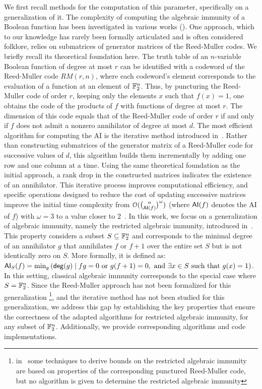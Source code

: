 \documentclass[11pt]{llncs}
\begin{document}
We first recall methods for the computation of this parameter, specifically on a generalization of it.
The complexity of computing the algebraic immunity of a Boolean function has been investigated in various works (\eg \cite{EC:CouMei03,EC:ACGKMR06,C:HawRos04,FSE:DidTil06}).  
One approach, which to our knowledge has rarely been formally articulated and is often considered folklore, relies on submatrices of generator matrices of the Reed-Muller codes. 
We briefly recall its theoretical foundation here. 
The truth table of an $n$-variable Boolean function of degree at most $r$ can be identified with a codeword of the Reed-Muller code $RM(r,n)$, where each codeword's element corresponds to the evaluation of a function at an element of $\mathbb{F}_2^n$.  
Thus, by puncturing the Reed-Muller code of order $r$, keeping only the elements $x$ such that $f(x) = 1$, one obtains the code of the products of $f$ with functions of degree at most $r$. 
The dimension of this code equals that of the Reed-Muller code of order $r$ if and only if $f$ does not admit a nonzero annihilator of degree at most $d$.  
The most efficient algorithm for computing the AI is the iterative method introduced in~\cite{EC:ACGKMR06}. 
Rather than constructing submatrices of the generator matrix of a Reed-Muller code for successive values of $d$, this algorithm builds them incrementally by adding one row and one column at a time. 
Using the same theoretical foundation as the initial approach, a rank drop in the constructed matrices indicates the existence of an annihilator. 
This iterative process improves computational efficiency, and specific operations designed to reduce the cost of updating successive matrices improve the initial time complexity from $\mathcal{O}(\binom{n}{\mathsf{AI}(f)}^\omega)$ (where $\mathsf{AI}(f)$ denotes the AI of $f$) with $\omega = 3$ to a value closer to $2$~\cite{EC:ACGKMR06,C:HawRos04}. 
In this work, we focus on a generalization of algebraic immunity, namely the restricted algebraic immunity, introduced in~\cite{TOSC:CarMeaRot17}.  
This property considers a subset $S \subseteq \mathbb{F}_2^n$ and corresponds to the minimal degree of an annihilator $g$ that annihilates $f$ or $f+1$ over the entire set $S$ but is not identically zero on $S$. 
More formally, it is defined as:
$\mathsf{AI}_S(f) = \min_g\left(\mathsf{deg}(g) \mid fg = 0 \text{ or } g(f+1) = 0, \text{ and } \exists x \in S \text{ such that } g(x) = 1 \right)$.
In this setting, classical algebraic immunity corresponds to the special case where $S = \mathbb{F}_2^n$.  
Since the Reed-Muller approach has not been formalized for this generalization \footnote{in~\cite{TOSC:CarMeaRot17} some techniques to derive bounds on the restricted algebraic immunity are based on properties of the corresponding punctured Reed-Muller code, but no algorithm is given to determine the restricted algebraic immunity}, and the iterative method has not been studied for this generalization, we address this gap by establishing the key properties that ensure the correctness of the adapted algorithms for restricted algebraic immunity, for any subset of $\mathbb{F}_2^n$. 
Additionally, we provide corresponding algorithms and code implementations.  
\end{document}
